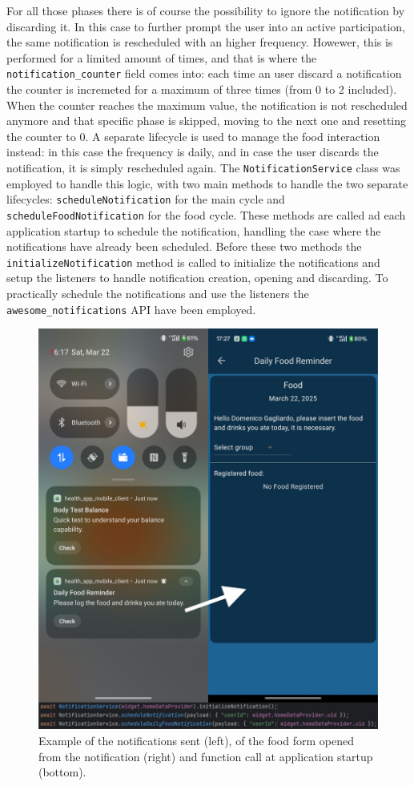 \noindent For all those phases there is of course the possibility to ignore the notification by discarding it. In this case to further prompt the user into an active participation, the same notification is rescheduled with an higher frequency. Howewer, this is performed for a limited amount of times, and that is where the \texttt{notification\_counter} field comes into: each time an user discard a notification the counter is incremeted for a maximum of three times (from 0 to 2 included). When the counter reaches the maximum value, the notification is not rescheduled anymore and that specific phase is skipped, moving to the next one and resetting the counter to 0.
\newpage \noindent A separate lifecycle is used to manage the food interaction instead: in this case the frequency is daily, and in case the user discards the notification, it is simply rescheduled again. 
\newline The \texttt{NotificationService} class was employed to handle this logic, with two main methods to handle the two separate lifecycles: \texttt{scheduleNotification} for the main cycle and \texttt{scheduleFoodNotification} for the food cycle. These methods are called ad each application startup to schedule the notification, handling the case where the notifications have already been scheduled. Before these two methods the \texttt{initializeNotification} method is called to initialize the notifications and setup the listeners to handle notification creation, opening and discarding. To practically schedule the notifications and use the listeners the \texttt{awesome\_notifications} API have been employed. 

\begin{figure}
    \centering
    \includegraphics[width=0.7\linewidth]{./images/notifications.jpg}
    \caption{Example of the notifications sent (left), of the food form opened from the notification (right) and function call at application startup (bottom).}
\end{figure}

